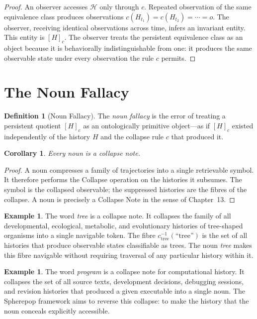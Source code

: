 \documentclass[12pt, a4paper, openany]{book}
\theoremstyle{plain}
\newtheorem{corollary}[theorem]{Corollary}
\theoremstyle{definition}
\newtheorem{definition}[theorem]{Definition}
\newtheorem{example}[theorem]{Example}
\theoremstyle{remark}
\newcommand{\calH}{\mathcal{H}}
\begin{document}
\begin{proof}
An observer accesses $\calH$ only through $c$. Repeated observation of the same
equivalence class produces observations $c(H_{t_1}) = c(H_{t_2}) = \cdots = o$.
The observer, receiving identical observations across time, infers an invariant
entity. This entity is $[H]_c$. The observer treats the persistent equivalence
class as an object because it is behaviorally indistinguishable from one: it
produces the same observable state under every observation the rule $c$ permits.
\end{proof}

\section{The Noun Fallacy}

\begin{definition}[Noun Fallacy]
The \emph{noun fallacy} is the error of treating a persistent quotient $[H]_c$
as an ontologically primitive object---as if $[H]_c$ existed independently of
the history $H$ and the collapse rule $c$ that produced it.
\end{definition}

\begin{corollary}
Every noun is a collapse note.
\end{corollary}

\begin{proof}
A noun compresses a family of trajectories into a single retrievable symbol.
It therefore performs the Collapse operation on the histories it subsumes. The
symbol is the collapsed observable; the suppressed histories are the fibres of the
collapse. A noun is precisely a Collapse Note in the sense of Chapter~13.
\end{proof}

\begin{example}
The word \emph{tree} is a collapse note. It collapses the family of all
developmental, ecological, metabolic, and evolutionary histories of tree-shaped
organisms into a single navigable token. The fibre $c_{\mathrm{tree}}^{-1}(\text{``tree''})$
is the set of all histories that produce observable states classifiable as trees.
The noun \emph{tree} makes this fibre navigable without requiring traversal of any
particular history within it.
\end{example}

\begin{example}
The word \emph{program} is a collapse note for computational history. It collapses
the set of all source texts, development decisions, debugging sessions, and
revision histories that produced a given executable into a single noun. The Spherepop
framework aims to reverse this collapse: to make the history that the noun
conceals explicitly accessible.
\end{example}
\end{document}
